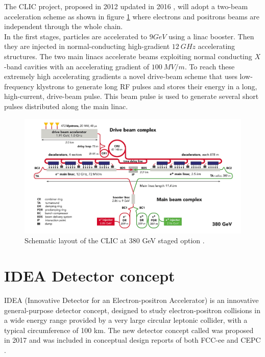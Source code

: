 The CLIC project, proposed in 2012 \cite{CLIC_old1, CLIC_old2, CLIC_old3} updated in 2016 \cite{CLIC_update}, will adopt a two-beam acceleration scheme as shown in figure \ref{fig:CLIC} where electrons and positrons beams are independent through the whole chain.\\
In the first stages, particles are accelerated to $9 GeV$ using a linac booster. Then they are injected in normal-conducting high-gradient $12\ GHz$ accelerating structures. The two main linacs accelerate beams exploiting normal conducting $X$-band cavities with an accelerating gradient of $100\ MV/m$. To reach these extremely high accelerating gradients a novel drive-beam scheme that uses low-frequency klystrons to generate long RF pulses and stores their energy in a long, high-current, drive-beam pulse. This beam pulse is used to generate several short pulses distributed along the main linac.

\begin{figure}
	\centering
	\includegraphics[width=.8\textwidth]{IMG/Cap1/CLIC.png}
	\caption{Schematic layout of the CLIC at 380 GeV staged option \cite{CLIC_img}.}
	\label{fig:CLIC}
\end{figure}

\section{IDEA Detector concept} \label{sec:Idea_project}
IDEA (Innovative Detector for an Electron-positron Accelerator) is an innovative general-purpose detector concept, designed to study electron-positron collisions in a wide energy range provided by a very large circular leptonic collider, with a typical circumference of 100 km.
The new detector concept called was proposed in 2017 and was included in conceptual design reports of both FCC-ee \cite{FCC-ee_design} and CEPC \cite{CEPC_design}.

